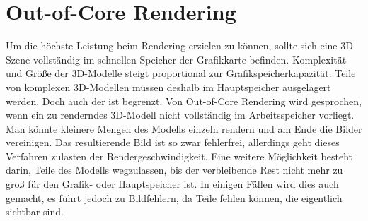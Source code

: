 \section{Out-of-Core Rendering}
\label{sec:relwork:oocrender}
Um die höchste Leistung beim Rendering erzielen zu können, sollte sich eine 3D-Szene vollständig im schnellen Speicher der Grafikkarte befinden. Komplexität und Größe der 3D-Modelle steigt proportional zur Grafikspeicherkapazität. Teile von komplexen 3D-Modellen müssen deshalb im Hauptspeicher ausgelagert werden. Doch auch der ist begrenzt. Von Out-of-Core Rendering wird gesprochen, wenn ein zu renderndes 3D-Modell nicht vollständig im Arbeitsspeicher vorliegt. Man könnte kleinere Mengen des Modells einzeln rendern und am Ende die Bilder vereinigen. Das resultierende Bild ist so zwar fehlerfrei, allerdings geht dieses Verfahren zulasten der Rendergeschwindigkeit. Eine weitere Möglichkeit besteht darin, Teile des Modells wegzulassen, bis der verbleibende Rest nicht mehr zu groß für den Grafik- oder Hauptspeicher ist. In einigen Fällen wird dies auch gemacht, es führt jedoch zu Bildfehlern, da Teile fehlen können, die eigentlich sichtbar sind.

